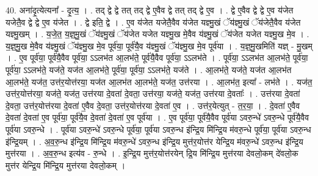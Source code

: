 \documentclass[17pt]{extarticle}
\begin{document}
40. अना॑दृ॒त्येत्यना᳚ - दृ॒त्य॒ । . तद् द्वे द्वे तत् तद् द्वे ए॒वैव द्वे तत् तद् द्वे ए॒व । . द्वे ए॒वैव द्वे द्वे ए॒व य॑जेत यजेतै॒व द्वे द्वे ए॒व य॑जेत । . द्वे इति॒ द्वे । . ए॒व य॑जेत यजेतै॒वैव य॑जेत यज्ञ्मु॒खं ॅय॑ज्ञ्मु॒खं ॅय॑जेतै॒वैव य॑जेत यज्ञ्मु॒खम् । . य॒जे॒त॒ य॒ज्ञ्॒मु॒खं ॅय॑ज्ञ्मु॒खं ॅय॑जेत यजेत यज्ञ्मु॒ख मे॒वैव य॑ज्ञ्मु॒खं ॅय॑जेत यजेत यज्ञ्मु॒ख मे॒व । . य॒ज्ञ्॒मु॒ख मे॒वैव य॑ज्ञ्मु॒खं ॅय॑ज्ञ्मु॒ख मे॒व पूर्व॑या॒ पूर्व॑यै॒व य॑ज्ञ्मु॒खं ॅय॑ज्ञ्मु॒ख मे॒व पूर्व॑या । . य॒ज्ञ्॒मु॒खमिति॑ यज्ञ् - मु॒खम् । . ए॒व पूर्व॑या॒ पूर्व॑यै॒वैव पूर्व॑या॒ ऽऽलभ॑त आ॒लभ॑ते॒ पूर्व॑यै॒वैव पूर्व॑या॒ ऽऽलभ॑ते । . पूर्व॑या॒ ऽऽलभ॑त आ॒लभ॑ते॒ पूर्व॑या॒ पूर्व॑या॒ ऽऽलभ॑ते॒ यज॑ते॒ यज॑त आ॒लभ॑ते॒ पूर्व॑या॒ पूर्व॑या॒ ऽऽलभ॑ते॒ यज॑ते । . आ॒लभ॑ते॒ यज॑ते॒ यज॑त आ॒लभ॑त आ॒लभ॑ते॒ यज॑त॒ उत्त॑र॒योत्त॑रया॒ यज॑त आ॒लभ॑त आ॒लभ॑ते॒ यज॑त॒ उत्त॑रया । . आ॒लभ॑त॒ इत्या᳚ - लभ॑ते । . यज॑त॒ उत्त॑र॒योत्त॑रया॒ यज॑ते॒ यज॑त॒ उत्त॑रया दे॒वता॑ दे॒वता॒ उत्त॑रया॒ यज॑ते॒ यज॑त॒ उत्त॑रया दे॒वताः᳚ । . उत्त॑रया दे॒वता॑ दे॒वता॒ उत्त॑र॒योत्त॑रया दे॒वता॑ ए॒वैव दे॒वता॒ उत्त॑र॒योत्त॑रया दे॒वता॑ ए॒व । . उत्त॑र॒येत्युत् - त॒र॒या॒ । . दे॒वता॑ ए॒वैव दे॒वता॑ दे॒वता॑ ए॒व पूर्व॑या॒ पूर्व॑यै॒व दे॒वता॑ दे॒वता॑ ए॒व पूर्व॑या । . ए॒व पूर्व॑या॒ पूर्व॑यै॒वैव पूर्व॑या ऽवरु॒न्धे॑ ऽवरु॒न्धे पूर्व॑यै॒वैव पूर्व॑या ऽवरु॒न्धे । . पूर्व॑या ऽवरु॒न्धे॑ ऽवरु॒न्धे पूर्व॑या॒ पूर्व॑या ऽवरु॒न्ध इ॑न्द्रि॒य मि॑न्द्रि॒य म॑वरु॒न्धे पूर्व॑या॒ पूर्व॑या ऽवरु॒न्ध इ॑न्द्रि॒यम् । . अ॒व॒रु॒न्ध इ॑न्द्रि॒य मि॑न्द्रि॒य म॑वरु॒न्धे॑ ऽवरु॒न्ध इ॑न्द्रि॒य मुत्त॑र॒योत्त॑र येन्द्रि॒य म॑वरु॒न्धे॑ ऽवरु॒न्ध इ॑न्द्रि॒य मुत्त॑रया । . अ॒व॒रु॒न्ध इत्य॑व - रु॒न्धे । . इ॒न्द्रि॒य मुत्त॑र॒योत्त॑रयेन् द्रि॒य मि॑न्द्रि॒य मुत्त॑रया देवलो॒कम् दे॑वलो॒क मुत्त॑र येन्द्रि॒य मि॑न्द्रि॒य मुत्त॑रया देवलो॒कम् । \newline
\end{document}
